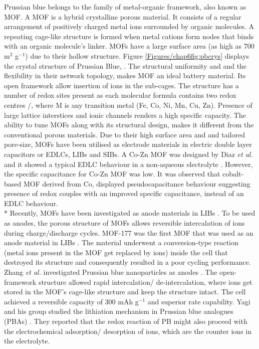 Prussian blue belongs to the family of metal-organic framework, also known as MOF. A MOF is a hybrid crystalline porous material. It consists of a regular arrangement of positively charged metal ions surrounded by organic molecules. A repeating cage-like structure is formed when metal cations form nodes that binds with an organic molecule's linker. MOFs have a large surface area (as high as 700 m$^{2}$ g$^{-1}$) due to their hollow structure. Figure \ref{Figures/chap6fig:pbcrys} displays the crystal structure of Prussian Blue, . The structural uniformity and and the flexibility in their network topology, makes MOF an ideal battery material. Its open framework allow insertion of ions in the sub-cages. The structure has a number of redox sites present as each molecular formula contains two redox centres /, where M is any transition metal (Fe, Co, Ni, Mn, Cu, Zn). Presence of large lattice interstices and ionic channels renders a high specific capacity. The ability to tune MOFs along with its structural design, makes it different from the conventional porous materials. Due to their high surface area and and tailored pore-size, MOFs have been utilised as electrode materials in electric double layer capacitors or EDLCs, LIBs and SIBs. A Co-Zn MOF was designed by Diaz \textit{et al.} and it showed a typical EDLC behaviour in a non-aqueous electrolyte \cite{diaz_co8-mof-5_2012}. However, the specific capacitance for Co-Zn MOF was low. It was observed that cobalt-based MOF derived from Co, displayed pseudocapacitance behaviour suggesting presence of redox couples with an improved specific capacitance, instead of an EDLC behaviour. \\*
Recently, MOFs have been investigated as anode materials in LIBs \cite{li_shape-controlled_2006,han_synthesis_2012,zhao_metalorganic_2015}. To be used as anodes, the porous structure of MOFs allows reversible intercalation of  ions during charge/discharge cycles. MOF-177 was the first MOF that was used as an anode material in LIBs \cite{li_shape-controlled_2006}. The material underwent a conversion-type reaction (metal ions present in the MOF get replaced by  ions) inside the cell that destroyed its structure and consequently resulted in a poor cycling performance. Zhang \textit{et al.} investigated Prussian blue nanoparticles as anodes \cite{nie_prussian_2014}. The open-framework structure allowed rapid intercalation/ de-intercalation, where  ions get stored in the MOF's cage-like structure and keep the structure intact. The cell achieved a reversible capacity of 300 mAh g$^{-1}$ and superior rate capability. Yagi and his group studied the lithiation mechanism in Prussian blue analogues (PBAs) \cite{yagi_eqcm_2014}. They reported that the redox reaction of PB might also proceed with the electrochemical adsorption/ desorption of  ions, which are the counter ions in the electrolyte. 
